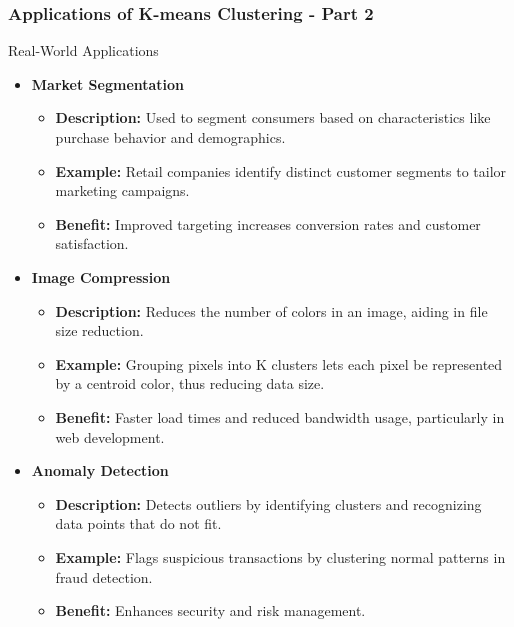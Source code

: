\documentclass[aspectratio=169]{beamer}
\begin{document}
\begin{frame}[fragile]
    \frametitle{Applications of K-means Clustering - Part 2}
    \begin{block}{Real-World Applications}
        \begin{itemize}
            \item \textbf{Market Segmentation}
                \begin{itemize}
                    \item \textbf{Description:} Used to segment consumers based on characteristics like purchase behavior and demographics.
                    \item \textbf{Example:} Retail companies identify distinct customer segments to tailor marketing campaigns.
                    \item \textbf{Benefit:} Improved targeting increases conversion rates and customer satisfaction.
                \end{itemize}
                
            \item \textbf{Image Compression}
                \begin{itemize}
                    \item \textbf{Description:} Reduces the number of colors in an image, aiding in file size reduction.
                    \item \textbf{Example:} Grouping pixels into K clusters lets each pixel be represented by a centroid color, thus reducing data size.
                    \item \textbf{Benefit:} Faster load times and reduced bandwidth usage, particularly in web development.
                \end{itemize}
                
            \item \textbf{Anomaly Detection}
                \begin{itemize}
                    \item \textbf{Description:} Detects outliers by identifying clusters and recognizing data points that do not fit.
                    \item \textbf{Example:} Flags suspicious transactions by clustering normal patterns in fraud detection.
                    \item \textbf{Benefit:} Enhances security and risk management.
                \end{itemize}
        \end{itemize}
    \end{block}
\end{frame}
\end{document}
